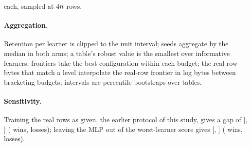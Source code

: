 \documentclass{article}
\begin{document}
each, sampled at $4n$ rows. \paragraph{Aggregation.} Retention per learner is clipped to the unit
interval; seeds aggregate by the median in both arms; a table's robust value is the smallest over
informative learners; frontiers take the best configuration within each budget; the real-row bytes that
match a level interpolate the real-row frontier in log bytes between bracketing budgets; intervals are
percentile bootstraps over tables. \paragraph{Sensitivity.} Training the real rows as given, the earlier
protocol of this study, gives a gap of \EbAsGivenGap{} [\EbAsGivenGapLo, \EbAsGivenGapHi] (\EbAsGivenWins{}
wins, \EbAsGivenLosses{} losses); leaving the MLP out of the worst-learner score gives \EbNoMlpGap{}
[\EbNoMlpGapLo, \EbNoMlpGapHi] (\EbNoMlpWins{} wins, \EbNoMlpLosses{} losses).

\begin{table}[h]
\caption{Per-table results of the equal-byte study for the headline-shape rung. \emph{Rows $T$}: worst-learner
retention of the real rows that fit in the program's bytes. \emph{Ratio}: real-row bytes needed to match the
program over the program's bytes. TDL columns: smallest power-of-two budget reaching the threshold, program
ladder versus real rows; a dash marks a threshold not reached.}
\label{tab:lineages}
\centering
\scriptsize
\setlength{\tabcolsep}{3pt}
\end{table}
\end{document}
